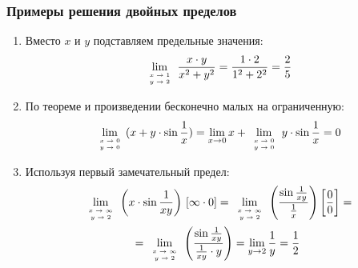 \subsubsection{Примеры решения двойных пределов}
\begin{enumerate}
	\item Вместо $x$ и $y$ подставляем предельные значения:
	\begin{align*}
		\lim_{\tiny{\begin{array}[b]{c} x \to 1\\y \to 2 \end{array}}} \frac{x \cdot y}{x^2 + y^2} =
		\frac{1 \cdot 2}{1^2 + 2^2} =
		\frac{2}{5}
	\end{align*}

	\item По теореме и произведении бесконечно малых на ограниченную:
	\begin{align*}
		\lim_{\tiny{\begin{array}[b]{c} x \to 0\\y \to 0 \end{array}}} (x + y \cdot \sin \frac{1}{x}) =
		\lim_{x \to 0} x + \lim_{\tiny{\begin{array}[b]{c} x \to 0\\y \to 0 \end{array}}} y \cdot \sin \frac{1}{x} =
		0
	\end{align*}

	\item Используя первый замечательный предел:
	\begin{multline*}
		\lim_{\tiny{\begin{array}[b]{c} x \to \infty \\y \to 2 \end{array}}} \left(x \cdot \sin \frac{1}{xy}\right) \, [\infty \cdot 0] =
		\lim_{\tiny{\begin{array}[b]{c} x \to \infty \\y \to 2 \end{array}}} \left(\frac{\sin \frac{1}{xy}}{\frac{1}{x}}\right) \left[\frac{0}{0}\right] =\\=
		\lim_{\tiny{\begin{array}[b]{c} x \to \infty \\y \to 2 \end{array}}} \left(\frac{\sin \frac{1}{xy}}{\frac{1}{xy} \cdot y}\right) =
		\lim_{y \to 2} \frac{1}{y} = \frac{1}{2}
	\end{multline*}


\end{enumerate}
